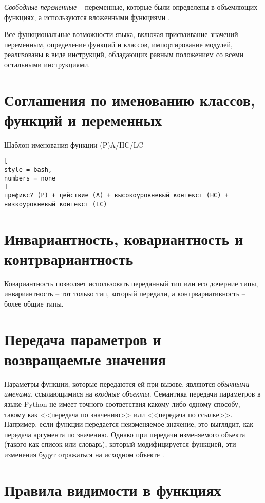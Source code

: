 \documentclass[%
	11pt,
	a4paper,
	utf8,
		]{article}
\begin{document}
\emph{Свободные переменные} -- переменные, которые были определены в объемлющих функциях, а используются вложенными функциями \cite[]{beazley:python-2010}.

Все функциональные возможности языка, включая присваивание значений переменным, определение функций и классов, импортирование модулей, реализованы в виде инструкций, обладающих равным положением со всеми остальными инструкциями.

\section{Соглашения по именованию классов, функций и переменных}

Шаблон именования функции (P)A/HC/LC
\begin{lstlisting}[
style = bash,
numbers = none
]
префикс? (P) + действие (A) + высокоуровневый контекст (HC) + низкоуровневый контекст (LC)
\end{lstlisting}

\section{Инвариантность, ковариантность и контрвариантность}

Ковариантность позволяет использовать переданный тип или его дочерние типы, инвариантность -- тот только тип, который передали, а контрвариативность -- более общие типы.

\section{Передача параметров и возвращаемые значения}

Параметры функции, которые передаются ей при вызове, являются \emph{обычными именами}, ссылающимися на \emph{входные объекты}. Семантика передачи параметров в языке Python не имеет точного соответствия какому-либо одному способу, такому как <<передача по значению>> или <<передача по ссылке>>. Например, если функции передается неизменяемое значение, это выглядит, как передача аргумента по значению. Однако при передачи изменяемого объекта (такого как список или словарь), который модифицируется функцией, эти изменения будут отражаться на исходном объекте \cite[]{beazley:python-2010}.

\section{Правила видимости в функциях}
\end{document}
